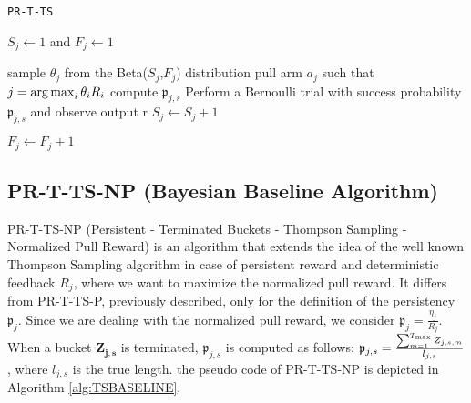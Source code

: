 \begin{algorithm}[H]
	\caption{\texttt{PR-T-TS}}
	\begin{scriptsize}
		\begin{algorithmic}[1]
			
			
			
			
			
			 
				\State $S_j \gets 1$ and $F_j \gets 1$
			\EndFor
			
			  
				\State sample $\theta_j$ from the Beta($S_j$,$F_j$) distribution
				\EndFor
			\State pull arm $a_j$ such that $j = \operatorname*{arg\,max}_i \theta_iR_i$
			 
				\State compute $\mathfrak{p}_{j,s}$
				\State Perform a Bernoulli trial with success probability $\mathfrak{p}_{j,s}$ and observe output r
				 \;
				\State $S_j \gets S_j + 1$ \;
				
				\Else
				\State $F_j \gets F_j + 1$ \;
				
				\EndIf
				\EndIf		
			\EndFor
			
			\EndFor
			\EndFor
			
			
			\EndFunction
			
		\end{algorithmic}
	\end{scriptsize}
	\label{alg:TSBASELINE}
\end{algorithm}

\subsection{PR-T-TS-NP (Bayesian Baseline Algorithm)}
PR-T-TS-NP (Persistent - Terminated Buckets - Thompson Sampling - Normalized Pull Reward) is an algorithm that extends the idea of the well known Thompson Sampling algorithm in case of persistent reward and deterministic feedback $R_j$, where we want to maximize the normalized pull reward. It differs from PR-T-TS-P, previously described, only for the definition of the persistency $\mathfrak{p}_{j}$. Since we are dealing with the normalized pull reward, we consider $\mathfrak{p}_{j} = \frac{\eta_j}{R_j}$. When a bucket $\boldsymbol{Z_{j,s}}$ is terminated, $\mathfrak{p}_{j,s}$ is computed as follows: $\mathfrak{p}_{j,s} = \frac{\sum_{m=1}^{T_{\textnormal{max}}} Z_{j,s,m}}{l_{j,s}}$, where $l_{j,s}$ is the true length. the pseudo code of PR-T-TS-NP  is depicted in Algorithm \ref{alg:TSBASELINE}.


